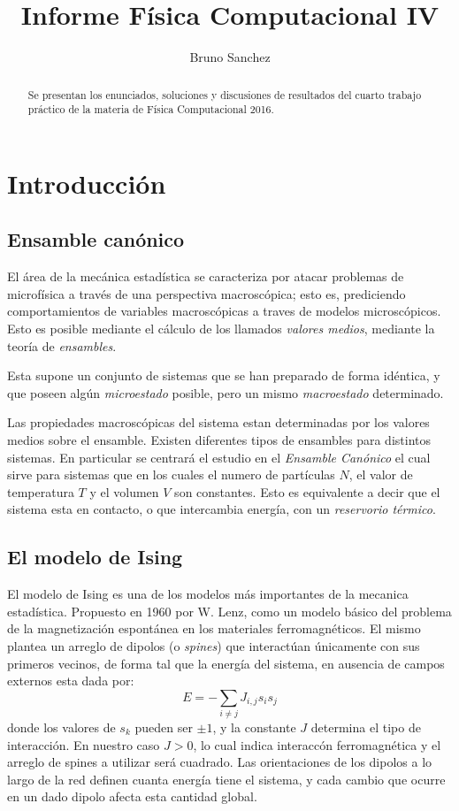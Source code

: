 \documentclass[a4paper,10pt]{paper}
\title{Informe F\'isica Computacional IV}
\author{Bruno Sanchez}
\begin{document}
\maketitle

\begin{abstract}
Se presentan los enunciados, soluciones y discusiones de resultados del cuarto trabajo pr\'actico
de la materia de F\'{i}sica Computacional 2016.
\end{abstract}

\section{Introducci\'on}
\subsection{Ensamble can\'onico}
El \'area de la mec\'anica estad\'istica se caracteriza por atacar problemas de microf\'isica a trav\'es
de una perspectiva macrosc\'opica; esto es, prediciendo comportamientos de variables
macrosc\'opicas a traves de modelos microsc\'opicos.
Esto es posible mediante el c\'alculo de los llamados \textit{valores medios}, mediante la teor\'ia de \textit{ensambles}.

Esta supone un conjunto de sistemas que se han preparado de forma id\'entica, y que poseen alg\'un \textit{microestado}
posible, pero un mismo \textit{macroestado} determinado.

Las propiedades macrosc\'opicas del sistema estan determinadas por los valores medios sobre el ensamble.
Existen diferentes tipos de ensambles para distintos sistemas.
En particular se centrar\'a el estudio en el \textit{Ensamble Can\'onico} el cual sirve para sistemas que 
en los cuales el numero de part\'iculas $N$, el valor de temperatura $T$ y el volumen $V$ son constantes.
Esto es equivalente a decir que el sistema esta en contacto, o que intercambia energ\'ia, con un 
\textit{reservorio t\'ermico}.

\subsection{El modelo de Ising}
El modelo de Ising es una de los modelos m\'as importantes de la mecanica estad\'istica. Propuesto
en 1960 por W. Lenz, como un modelo b\'asico del problema de la magnetizaci\'on espont\'anea
en los materiales ferromagn\'eticos. El mismo plantea un arreglo de dipolos (o \textit{spines}) que interact\'uan
\'unicamente con sus primeros vecinos, de forma tal que la energ\'ia del sistema, en ausencia de 
campos externos esta dada por:
\begin{displaymath}
 E = - \sum\limits_{i\neq j}J_{i,j} s_i s_j 
\end{displaymath}
 donde los valores de $s_k$ pueden ser $\pm1$, y la constante $J$ determina el tipo de interacci\'on.
 En nuestro caso $J>0$, lo cual indica interacc\'on ferromagn\'etica y el arreglo de spines a utilizar ser\'a cuadrado.
 Las orientaciones de los dipolos a lo largo de la red definen cuanta energ\'ia tiene el sistema, 
 y cada cambio que ocurre en un dado dipolo afecta esta cantidad global.
\end{document}
